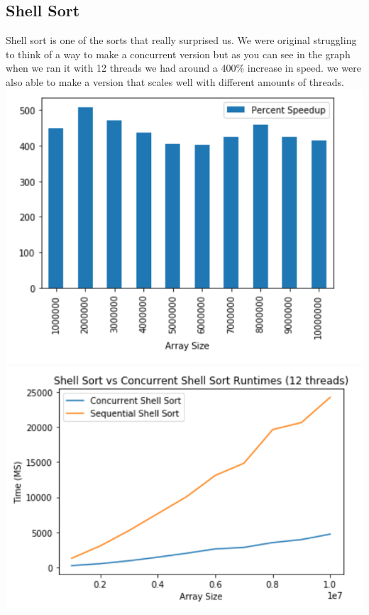 \documentclass{article}
\begin{document}
\subsection{Shell Sort}
Shell sort is one of the sorts that really surprised us. We were original struggling to think of a way to make a concurrent version but as you can see in the graph when we ran it with  12 threads we had around a 400\% increase in speed. we were also able to make a version that scales well with different amounts of threads.\newline
\includegraphics{figures/shellbar.PNG}\newline
\includegraphics{figures/shellline.PNG}
\end{document}
